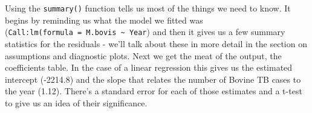 \documentclass[
]{book}
\newenvironment{Shaded}{\begin{snugshade}}{\end{snugshade}}
\newcommand{\DataTypeTok}[1]{\textcolor[rgb]{0.13,0.29,0.53}{#1}}
\newcommand{\DecValTok}[1]{\textcolor[rgb]{0.00,0.00,0.81}{#1}}
\newcommand{\ErrorTok}[1]{\textcolor[rgb]{0.64,0.00,0.00}{\textbf{#1}}}
\newcommand{\FloatTok}[1]{\textcolor[rgb]{0.00,0.00,0.81}{#1}}
\newcommand{\KeywordTok}[1]{\textcolor[rgb]{0.13,0.29,0.53}{\textbf{#1}}}
\newcommand{\NormalTok}[1]{#1}
\newcommand{\OperatorTok}[1]{\textcolor[rgb]{0.81,0.36,0.00}{\textbf{#1}}}
\newcommand{\StringTok}[1]{\textcolor[rgb]{0.31,0.60,0.02}{#1}}
\begin{document}
\begin{Shaded}
\end{Shaded}

Using the \texttt{summary()} function tells us most of the things we need to know. It begins by reminding us what the model we fitted was (\texttt{Call:lm(formula\ =\ M.bovis\ \textasciitilde{}\ Year}) and then it gives us a few summary statistics for the residuals - we'll talk about these in more detail in the section on assumptions and diagnostic plots. Next we get the meat of the output, the coefficients table. In the case of a linear regression this gives us the estimated intercept (-2214.8) and the slope that relates the number of Bovine TB cases to the year (1.12). There's a standard error for each of those estimates and a t-test to give us an idea of their significance.
\end{document}
